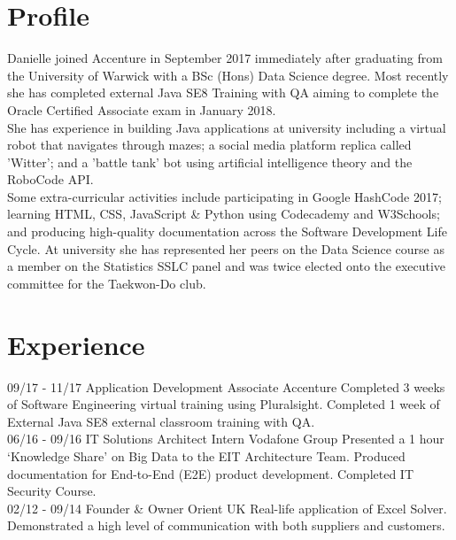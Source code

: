 \documentclass[]{friggeri-cv}
\begin{document}
\section{Profile}
      Danielle joined Accenture in September 2017 immediately after graduating from the University of Warwick with a BSc (Hons) Data Science degree. Most recently she has completed external Java SE8 Training with QA aiming to complete the Oracle Certified Associate exam in January 2018.\\
      
      She has experience in building Java applications at university including a virtual robot that navigates through mazes; a social media platform replica called 'Witter'; and a 'battle tank' bot using artificial intelligence theory and the RoboCode API.\\
      
      Some extra-curricular activities include participating in Google HashCode 2017; learning HTML, CSS, JavaScript \& Python using Codecademy and W3Schools; and producing high-quality documentation across the Software Development Life Cycle. At university she has represented her peers on the Data Science course as a member on the Statistics SSLC panel and was twice elected onto the executive committee for the Taekwon-Do club.

\section{Experience}
\begin{entrylist}
    \entry
    {09/17 - 11/17}
    {Application Development Associate}
    {Accenture}
    {Completed 3 weeks of Software Engineering virtual training using Pluralsight. Completed 1 week of External Java SE8 external classroom training with QA.\\}
    \entry
    {06/16 - 09/16}
    {IT Solutions Architect Intern}
    {Vodafone Group}
    {Presented a 1 hour ‘Knowledge Share’ on Big Data to the EIT Architecture Team. Produced documentation for End-to-End (E2E) product development. Completed IT Security Course.\\}
    \entry
    {02/12 - 09/14}
    {Founder \& Owner}
    {Orient UK}
    {Real-life application of Excel Solver. Demonstrated a high level of communication with both suppliers and customers.\\}
\end{entrylist}
\end{document}
